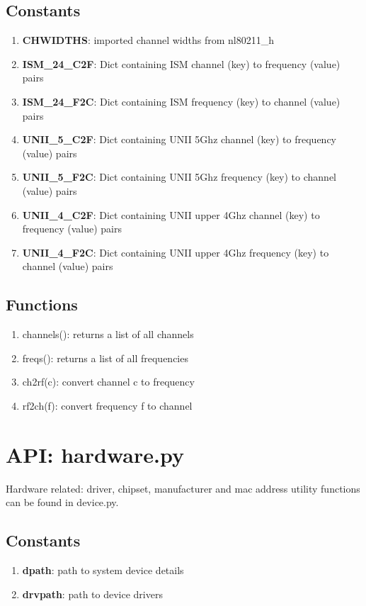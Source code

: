 \documentclass[11pt]{article}
\begin{document}
\begin{appendices}
\subsection{Constants}
\begin{enumerate}
\item \textbf{CHWIDTHS}: imported channel widths from nl80211\_h
\item \textbf{ISM\_24\_C2F}: Dict containing ISM channel (key) to frequency (value) 
pairs
\item \textbf{ISM\_24\_F2C}: Dict containing ISM frequency (key) to channel (value)
pairs
\item \textbf{UNII\_5\_C2F}: Dict containing UNII 5Ghz channel (key) to frequency 
(value) pairs
\item \textbf{UNII\_5\_F2C}: Dict containing UNII 5Ghz frequency (key) to channel 
(value) pairs
\item \textbf{UNII\_4\_C2F}: Dict containing UNII upper 4Ghz channel (key) to 
frequency (value) pairs
\item \textbf{UNII\_4\_F2C}: Dict containing UNII upper 4Ghz frequency (key) to 
channel (value) pairs
\end{enumerate}

\subsection{Functions}
\begin{enumerate}
\item channels(): returns a list of all channels
\item freqs(): returns a list of all frequencies
\item ch2rf(c): convert channel c to frequency
\item rf2ch(f): convert frequency f to channel
\end{enumerate}

\section{API: hardware.py}\label{sec:hardwareapi}
Hardware related: driver, chipset, manufacturer and mac address utility functions 
can be found in device.py.

\subsection{Constants}
\begin{enumerate}
\item \textbf{dpath}: path to system device details
\item \textbf{drvpath}: path to device drivers 
\end{enumerate}


\end{appendices}
\end{document}
